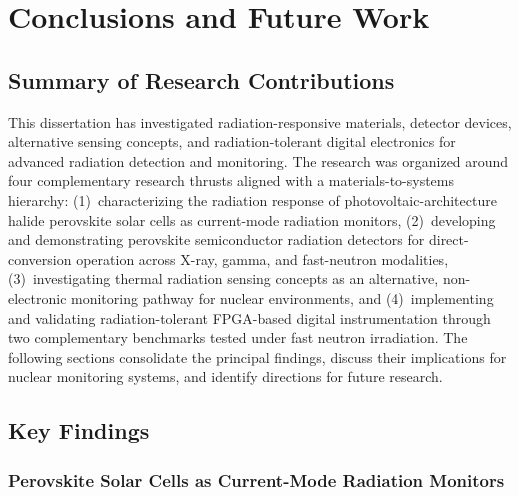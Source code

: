 
\chapter{Conclusions and Future Work}
\label{ch:conclusions}

\section{Summary of Research Contributions}
\label{sec:conc_summary}

This dissertation has investigated radiation-responsive materials,
detector devices, alternative sensing concepts, and radiation-tolerant
digital electronics for advanced radiation detection and monitoring.
The research was organized around four complementary research thrusts
aligned with a materials-to-systems hierarchy:
(1)~characterizing the radiation response of photovoltaic-architecture
halide perovskite solar cells as current-mode radiation monitors,
(2)~developing and demonstrating perovskite semiconductor radiation
detectors for direct-conversion operation across X-ray, gamma, and
fast-neutron modalities,
(3)~investigating thermal radiation sensing concepts as an alternative,
non-electronic monitoring pathway for nuclear environments, and
(4)~implementing and validating radiation-tolerant FPGA-based digital
instrumentation through two complementary benchmarks tested under fast
neutron irradiation.  The following
sections consolidate the principal findings, discuss their
implications for nuclear monitoring systems, and identify directions
for future research.


\section{Key Findings}
\label{sec:conc_findings}

\subsection{Perovskite Solar Cells as Current-Mode Radiation Monitors}

